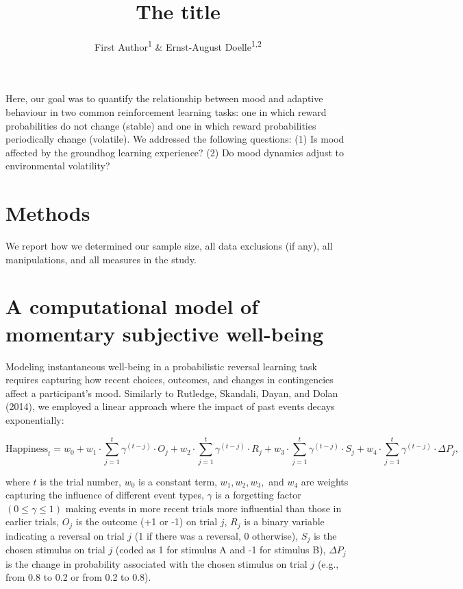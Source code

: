 \documentclass[
  man]{apa6}
\title{The title}
\author{First Author\textsuperscript{1} \& Ernst-August Doelle\textsuperscript{1,2}}
\date{}
\affiliation{\vspace{0.5cm}\textsuperscript{1} Wilhelm-Wundt-University\\\textsuperscript{2} Konstanz Business School}
\begin{document}
\maketitle

Here, our goal was to quantify the relationship between mood and adaptive behaviour in two common reinforcement learning tasks: one in which reward probabilities do not change (stable) and one in which reward probabilities periodically change (volatile). We addressed the following questions: (1) Is mood affected by the groundhog learning experience? (2) Do mood dynamics adjust to environmental volatility?

\hypertarget{methods}{%
\section{Methods}\label{methods}}

We report how we determined our sample size, all data exclusions (if any), all manipulations, and all measures in the study.

\hypertarget{a-computational-model-of-momentary-subjective-well-being}{%
\section{A computational model of momentary subjective well-being}\label{a-computational-model-of-momentary-subjective-well-being}}

Modeling instantaneous well-being in a probabilistic reversal learning task requires capturing how recent choices, outcomes, and changes in contingencies affect a participant's mood. Similarly to Rutledge, Skandali, Dayan, and Dolan (2014), we employed a linear approach where the impact of past events decays exponentially:

\[
\text{Happiness}_t = w_0 + w_1 \cdot \sum_{j=1}^{t} \gamma^{(t-j)} \cdot O_j + w_2 \cdot \sum_{j=1}^{t} \gamma^{(t-j)} \cdot R_j + w_3 \cdot \sum_{j=1}^{t} \gamma^{(t-j)} \cdot S_j + w_4 \cdot \sum_{j=1}^{t} \gamma^{(t-j)} \cdot \Delta P_j,
\]

where \(t\) is the trial number, \(w_0\) is a constant term, \(w_1, w_2, w_3,\) and \(w_4\) are weights capturing the influence of different event types, \(\gamma\) is a forgetting factor \((0 \leq \gamma \leq 1)\) making events in more recent trials more influential than those in earlier trials, \(O_j\) is the outcome (+1 or -1) on trial \(j\), \(R_j\) is a binary variable indicating a reversal on trial \(j\) (1 if there was a reversal, 0 otherwise), \(S_j\) is the chosen stimulus on trial \(j\) (coded as 1 for stimulus A and -1 for stimulus B), \(\Delta P_j\) is the change in probability associated with the chosen stimulus on trial \(j\) (e.g., from 0.8 to 0.2 or from 0.2 to 0.8).
\end{document}
